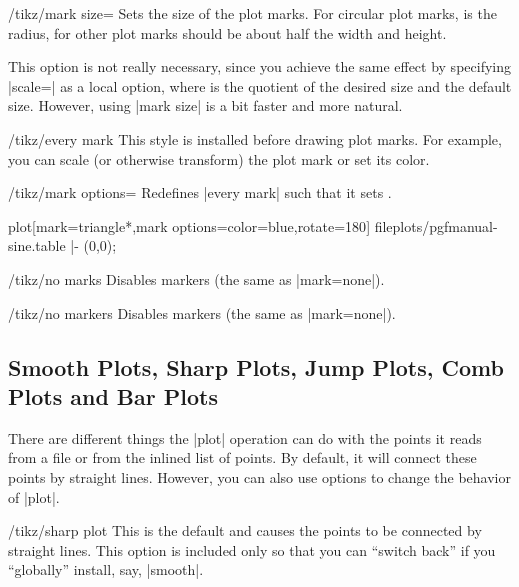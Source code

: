 \begin{key}{/tikz/mark size=}
    Sets the size of the plot marks. For circular plot marks, 
    is the radius, for other plot marks  should be about half
    the width and height.

    This option is not really necessary, since you achieve the same effect by
    specifying |scale=| as a local option, where  is
    the quotient of the desired size and the default size. However, using
    |mark size| is a bit faster and more natural.
\end{key}

\begin{stylekey}{/tikz/every mark}
    This style is installed before drawing plot marks. For example, you can
    scale (or otherwise transform) the plot mark or set its color.
\end{stylekey}

\begin{key}{/tikz/mark options=}
    Redefines |every mark| such that it sets .
\begin{codeexample}[]
\tikz \fill[fill=blue!20]
  plot[mark=triangle*,mark options={color=blue,rotate=180}]
    file{plots/pgfmanual-sine.table} |- (0,0);
\end{codeexample}
\end{key}

\begin{stylekey}{/tikz/no marks}
    Disables markers (the same as |mark=none|).
\end{stylekey}
%
\begin{stylekey}{/tikz/no markers}
    Disables markers (the same as |mark=none|).
\end{stylekey}


\subsection{Smooth Plots, Sharp Plots, Jump Plots, Comb Plots and Bar Plots}

There are different things the |plot| operation can do with the points it reads
from a file or from the inlined list of points. By default, it will connect
these points by straight lines. However, you can also use options to change the
behavior of |plot|.

\begin{key}{/tikz/sharp plot}
    This is the default and causes the points to be connected by straight
    lines. This option is included only so that you can ``switch back'' if you
    ``globally'' install, say, |smooth|.
\end{key}

